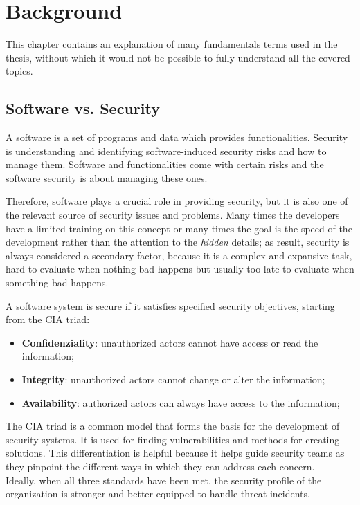 \chapter{Background}
\label{cha:background}


This chapter contains an explanation of many fundamentals terms used in the thesis, without which it would not be possible to fully understand all the covered topics. 

\section{Software vs. Security}

A software is a set of programs and data which provides functionalities. Security is understanding and identifying software-induced security risks and how to manage them. Software and functionalities come with certain risks and the software security is about managing these ones.

Therefore, software plays a crucial role in providing security, but it is also one of the relevant source of security issues and problems. Many times the developers have a limited training on this concept or many times the goal is the speed of the development rather than the attention to the \textit{hidden} details; as result, security is always considered a secondary factor, because it is a complex and expansive task, hard to evaluate when nothing bad happens but usually too late to evaluate when something bad happens.~\cite{st-slides}

A software system is secure if it satisfies specified security objectives, starting from the CIA triad:
\begin{itemize}
  \item \textbf{Confidenziality}: unauthorized actors cannot have access or read the information;
  \item \textbf{Integrity}: unauthorized actors cannot change or alter the information;
  \item \textbf{Availability}: authorized actors can always have access to the information;
\end{itemize}
The CIA triad is a common model that forms the basis for the development of security systems. It is used for finding vulnerabilities and methods for creating solutions. This differentiation is helpful because it helps guide security teams as they pinpoint the different ways in which they can address each concern.\\
Ideally, when all three standards have been met, the security profile of the organization is stronger and better equipped to handle threat incidents.~\cite{cia-triad}

